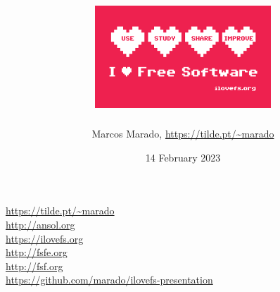 \documentclass[landscape]{slides}
\author{Marcos Marado, \url{https://tilde.pt/~marado}}
\title{\includegraphics{ilovefs-sticker_thumb.png}}
\date{14 February 2023}
\begin{document}

\begin{slide}
\maketitle
\end{slide}






\begin{slide}

\url{https://tilde.pt/~marado} \\
\url{http://ansol.org} \\
\url{https://ilovefs.org} \\
\url{http://fsfe.org} \\
\url{http://fsf.org} \\
\url{https://github.com/marado/ilovefs-presentation}
\end{slide}
\end{document}
